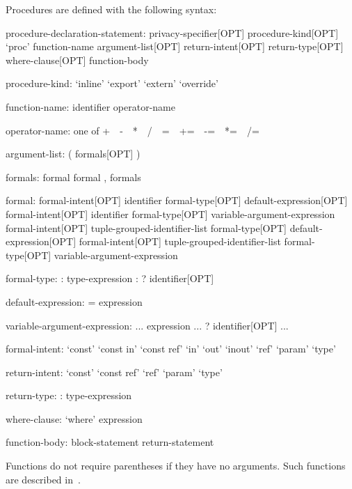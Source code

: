 Procedures are defined with the following syntax:
\begin{syntax}
procedure-declaration-statement:
  privacy-specifier[OPT] procedure-kind[OPT] `proc' function-name argument-list[OPT] return-intent[OPT] return-type[OPT] where-clause[OPT]
    function-body

procedure-kind:
  `inline'
  `export'
  `extern'
  `override'

function-name:
  identifier
  operator-name

operator-name: one of
  + $ $ $ $ - $ $ $ $ * $ $ $ $ / $ $ $ $ %
  = $ $ $ $ += $ $ $ $ -= $ $ $ $ *= $ $ $ $ /= $ $ $ $ %

argument-list:
  ( formals[OPT] )

formals:
  formal
  formal , formals

formal:
  formal-intent[OPT] identifier formal-type[OPT] default-expression[OPT]
  formal-intent[OPT] identifier formal-type[OPT] variable-argument-expression
  formal-intent[OPT] tuple-grouped-identifier-list formal-type[OPT] default-expression[OPT]
  formal-intent[OPT] tuple-grouped-identifier-list formal-type[OPT] variable-argument-expression

formal-type:
  : type-expression
  : ? identifier[OPT]

default-expression:
  = expression

variable-argument-expression:
  ... expression
  ... ? identifier[OPT]
  ...

formal-intent:
  `const'
  `const in'
  `const ref'
  `in'
  `out'
  `inout'
  `ref'
  `param'
  `type'

return-intent:
  `const'
  `const ref'
  `ref'
  `param'
  `type'

return-type:
  : type-expression

where-clause:
  `where' expression

function-body:
  block-statement
  return-statement
\end{syntax}


Functions do not require parentheses if they have no arguments.  Such
functions are described in~.

